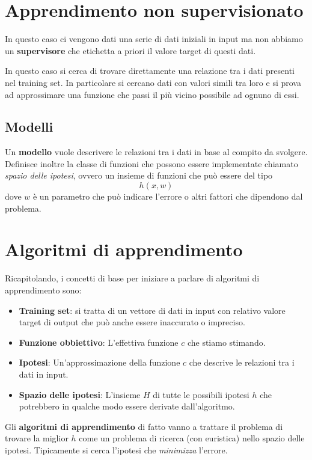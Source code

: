 \section{Apprendimento non supervisionato}
In questo caso ci vengono dati una serie di dati iniziali in input ma non abbiamo un \textbf{supervisore} che etichetta
a priori il valore target di questi dati.

In questo caso si cerca di trovare direttamente una relazione tra i dati presenti nel training set. In particolare si
cercano dati con valori simili tra loro e si prova ad approssimare una funzione che passi il pi\`u vicino possibile ad
ognuno di essi.

\subsection{Modelli}
Un \textbf{modello} vuole descrivere le relazioni tra i dati in base al compito da svolgere. Definisce inoltre la classe
di funzioni che possono essere implementate chiamato \emph{spazio delle ipotesi}, ovvero un insieme di funzioni
che pu\`o essere del tipo
\[ h(x, w) \]
dove $w$ \`e un parametro che pu\`o indicare l'errore o altri fattori che dipendono dal problema.

\section{Algoritmi di apprendimento}
Ricapitolando, i concetti di base per iniziare a parlare di algoritmi di apprendimento sono:
\begin{itemize}
	\item \textbf{Training set}: si tratta di un vettore di dati in input con relativo valore target di output
	      che pu\`o anche essere inaccurato o impreciso.
	\item \textbf{Funzione obbiettivo}: L'effettiva funzione $c$ che stiamo stimando.
	\item \textbf{Ipotesi}: Un'approssimazione della funzione $c$ che descrive le relazioni tra i dati in input.
	\item \textbf{Spazio delle ipotesi}: L'insieme $H$ di tutte le possibili ipotesi $h$ che potrebbero in qualche modo
	      essere derivate dall'algoritmo.
\end{itemize}

Gli \textbf{algoritmi di apprendimento} di fatto vanno a trattare il problema di trovare la miglior $h$ come un problema
di ricerca (con euristica) nello spazio delle ipotesi. Tipicamente si cerca l'ipotesi che \emph{minimizza} l'errore.

